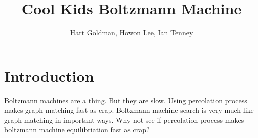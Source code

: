 \documentclass[12pt]{article}
\begin{document}
\title{Cool Kids Boltzmann Machine}
\author{Hart Goldman, Howon Lee, Ian Tenney}
\maketitle

\section{Introduction}
Boltzmann machines are a thing. But they are slow. Using percolation process makes graph matching fast as crap. Boltzmann machine search is very much like graph matching in important ways. Why not see if percolation process makes boltzmann machine equilibriation fast as crap?
\end{document}
